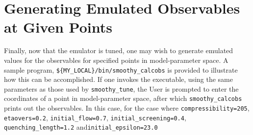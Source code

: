 \documentclass[UserManual.tex]{subfiles}
\begin{document}
\section{Generating Emulated Observables at Given Points}
Finally, now that the emulator is tuned, one may wish to generate emulated values for the observables for specified points in model-parameter space. A sample program, {\tt \$\{MY\_LOCAL\}/bin/smoothy\_calcobs} is provided to illustrate how this can be accomplished. If one invokes the executable, using the same parameters as those used by {\tt smoothy\_tune}, the User is prompted to enter the coordinates of a point in model-parameter space, after which {\tt smoothy\_calcobs} prints out the observables. In this case, for the case where {\tt compressibility=205}, {\tt etaovers=0.2}, {\tt initial\_flow=0.7}, {\tt initial\_screening=0.4}, {\tt quenching\_length=1.2} and{\tt initial\_epsilon=23.0}
\end{document}
